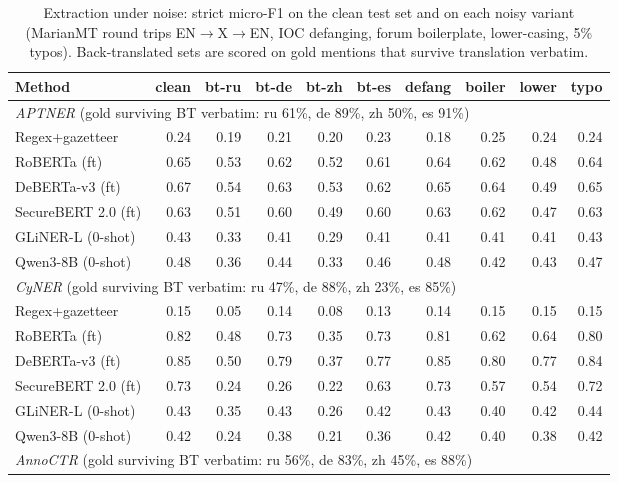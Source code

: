 \begin{table}[t]
\centering
\caption{Extraction under noise: strict micro-F1 on the clean test set and on each noisy variant (MarianMT round trips EN$\to$X$\to$EN, IOC defanging, forum boilerplate, lower-casing, 5\% typos). Back-translated sets are scored on gold mentions that survive translation verbatim.}
\label{tab:noise}
\small
\begin{adjustbox}{max width=\textwidth}
\begin{tabular}{lrrrrrrrrr}
\toprule
Method & clean & bt-ru & bt-de & bt-zh & bt-es & defang & boiler & lower & typo \\
\midrule
\multicolumn{10}{l}{\textit{APTNER} (gold surviving BT verbatim: ru 61\%, de 89\%, zh 50\%, es 91\%)} \\
Regex+gazetteer & 0.24 & 0.19 & 0.21 & 0.20 & 0.23 & 0.18 & 0.25 & 0.24 & 0.24 \\
RoBERTa (ft) & 0.65 & 0.53 & 0.62 & 0.52 & 0.61 & 0.64 & 0.62 & 0.48 & 0.64 \\
DeBERTa-v3 (ft) & 0.67 & 0.54 & 0.63 & 0.53 & 0.62 & 0.65 & 0.64 & 0.49 & 0.65 \\
SecureBERT 2.0 (ft) & 0.63 & 0.51 & 0.60 & 0.49 & 0.60 & 0.63 & 0.62 & 0.47 & 0.63 \\
GLiNER-L (0-shot) & 0.43 & 0.33 & 0.41 & 0.29 & 0.41 & 0.41 & 0.41 & 0.41 & 0.43 \\
Qwen3-8B (0-shot) & 0.48 & 0.36 & 0.44 & 0.33 & 0.46 & 0.48 & 0.42 & 0.43 & 0.47 \\
\multicolumn{10}{l}{\textit{CyNER} (gold surviving BT verbatim: ru 47\%, de 88\%, zh 23\%, es 85\%)} \\
Regex+gazetteer & 0.15 & 0.05 & 0.14 & 0.08 & 0.13 & 0.14 & 0.15 & 0.15 & 0.15 \\
RoBERTa (ft) & 0.82 & 0.48 & 0.73 & 0.35 & 0.73 & 0.81 & 0.62 & 0.64 & 0.80 \\
DeBERTa-v3 (ft) & 0.85 & 0.50 & 0.79 & 0.37 & 0.77 & 0.85 & 0.80 & 0.77 & 0.84 \\
SecureBERT 2.0 (ft) & 0.73 & 0.24 & 0.26 & 0.22 & 0.63 & 0.73 & 0.57 & 0.54 & 0.72 \\
GLiNER-L (0-shot) & 0.43 & 0.35 & 0.43 & 0.26 & 0.42 & 0.43 & 0.40 & 0.42 & 0.44 \\
Qwen3-8B (0-shot) & 0.42 & 0.24 & 0.38 & 0.21 & 0.36 & 0.42 & 0.40 & 0.38 & 0.42 \\
\multicolumn{10}{l}{\textit{AnnoCTR} (gold surviving BT verbatim: ru 56\%, de 83\%, zh 45\%, es 88\%)} \\

\end{tabular}
\end{adjustbox}
\end{table}
